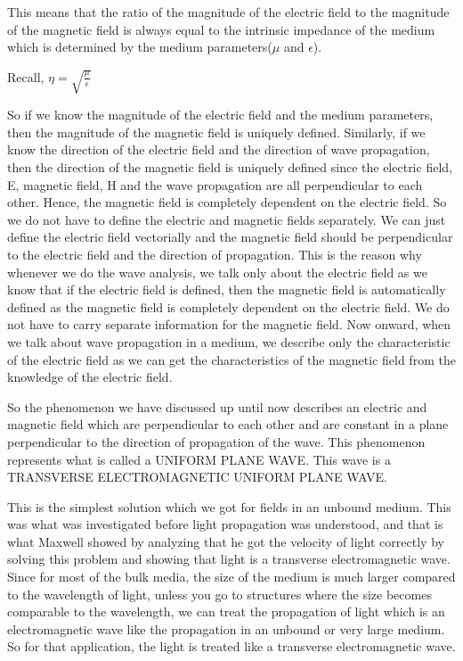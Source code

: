 This means that the ratio of the magnitude of the electric field to the magnitude of the magnetic field is always equal to the intrinsic impedance of the medium which is determined by the medium parameters($\mu$ and $\epsilon$).
\begin{center}
Recall, $\eta = \sqrt{\frac{\mu}{\epsilon}}$
\end{center}
So if we know the magnitude of the electric field and the medium parameters, then the magnitude of the magnetic field is uniquely defined. Similarly, if we know the direction of the electric field and the direction of wave propagation, then the direction of the magnetic field is uniquely defined since the electric field, E, magnetic field, H and the wave propagation are all perpendicular to each other. 
Hence, the magnetic field is completely dependent on the electric field. So we do not have to define the electric and magnetic fields separately.
We can just define the electric field vectorially and the magnetic field should be perpendicular to the electric field and the direction of propagation. This is the reason why whenever we do the wave analysis, we talk only about the electric field as we know that if the electric field is defined, then the magnetic field is automatically defined as the magnetic field is completely dependent on the electric field. We do not have to carry separate information for the magnetic field. Now onward, when we talk about wave propagation in a medium, we describe only the characteristic of the electric field as we can get the characteristics of the magnetic field from the knowledge of the electric field.

So the phenomenon we have discussed up until now describes an electric and magnetic field which are perpendicular to each other and are constant in a plane perpendicular to the direction of propagation of the wave. This phenomenon represents what is called a UNIFORM PLANE WAVE. This wave is a TRANSVERSE ELECTROMAGNETIC UNIFORM PLANE WAVE.

This is the simplest solution which we got for fields in an unbound medium. This was what was investigated before light propagation was understood, and that is what Maxwell showed by analyzing that he got the velocity of light correctly by solving this problem and showing that light is a transverse electromagnetic wave. Since for most of the bulk media, the size of the medium is much larger compared to the wavelength of light, unless you go to structures where the size becomes comparable to the wavelength, we can treat the propagation of light which is an electromagnetic wave like the propagation in an unbound or very large medium. So for that application, the light is treated like a transverse electromagnetic wave. 

